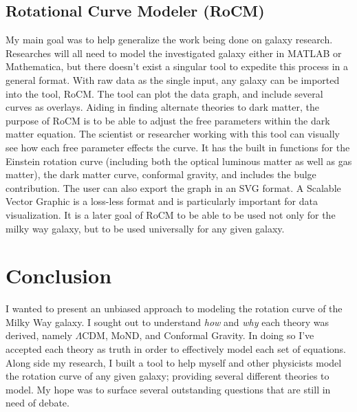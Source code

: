 \documentclass[titlepage]{article}
\begin{document}
\subsection{Rotational Curve Modeler (RoCM)}
My main goal was to help generalize the work being done on galaxy research. Researches will all need to model the investigated galaxy either in MATLAB or Mathematica, but there doesn't exist a singular tool to expedite this process in a general format. With raw data as the single input, any galaxy can be imported into the tool, RoCM. The tool can plot the data graph, and include several curves as overlays. Aiding in finding alternate theories to dark matter, the purpose of RoCM is to be able to adjust the free parameters within the dark matter equation. The scientist or researcher working with this tool can visually see how each free parameter effects the curve. It has the built in functions for the Einstein rotation curve (including both the optical luminous matter as well as gas matter), the dark matter curve, conformal gravity, and includes the bulge contribution. The user can also export the graph in an SVG format. A Scalable Vector Graphic is a loss-less format and is particularly important for data visualization.  It is a later goal of RoCM to be able to be used not only for the milky way galaxy, but to be used universally for any given galaxy.


\section{Conclusion}
I wanted to present an unbiased approach to modeling the rotation curve of the Milky Way galaxy. I sought out to understand \textit{how} and \textit{why} each theory was derived, namely $\Lambda$CDM, MoND, and Conformal Gravity. In doing so I've accepted each theory as truth in order to effectively model each set of equations. Along side my research, I built a tool to help myself and other physicists model the rotation curve of any given galaxy; providing several different theories to model. My hope was to surface several outstanding questions that are still in need of debate. %
\end{document}
